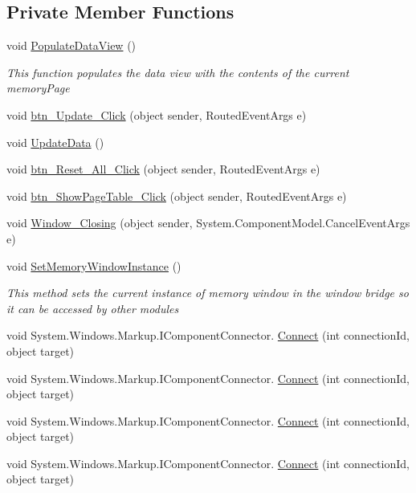 \subsection*{Private Member Functions}
\begin{DoxyCompactItemize}
\item 
void \hyperlink{class_c_p_u___o_s___simulator_1_1_memory_window_a8811287064d6315e3a8c01531148ed81}{Populate\+Data\+View} ()
\begin{DoxyCompactList}\small\item\em This function populates the data view with the contents of the current memory\+Page \end{DoxyCompactList}\item 
void \hyperlink{class_c_p_u___o_s___simulator_1_1_memory_window_a91ec1c8081b85d3c07eaa31ee524f5d9}{btn\+\_\+\+Update\+\_\+\+Click} (object sender, Routed\+Event\+Args e)
\item 
void \hyperlink{class_c_p_u___o_s___simulator_1_1_memory_window_ab0cb156466262b3d90f19acd422dc65b}{Update\+Data} ()
\item 
void \hyperlink{class_c_p_u___o_s___simulator_1_1_memory_window_ac77beff86f4dd6322bdcf2430892d2aa}{btn\+\_\+\+Reset\+\_\+\+All\+\_\+\+Click} (object sender, Routed\+Event\+Args e)
\item 
void \hyperlink{class_c_p_u___o_s___simulator_1_1_memory_window_a0540a495053120e2572a106dbbc391de}{btn\+\_\+\+Show\+Page\+Table\+\_\+\+Click} (object sender, Routed\+Event\+Args e)
\item 
void \hyperlink{class_c_p_u___o_s___simulator_1_1_memory_window_a6123a0a8b93cb6636ed3c039391948a5}{Window\+\_\+\+Closing} (object sender, System.\+Component\+Model.\+Cancel\+Event\+Args e)
\item 
void \hyperlink{class_c_p_u___o_s___simulator_1_1_memory_window_a5100fa341de6de08d11967198cd82208}{Set\+Memory\+Window\+Instance} ()
\begin{DoxyCompactList}\small\item\em This method sets the current instance of memory window in the window bridge so it can be accessed by other modules \end{DoxyCompactList}\item 
void System.\+Windows.\+Markup.\+I\+Component\+Connector. \hyperlink{class_c_p_u___o_s___simulator_1_1_memory_window_aba65e66795c99052ebed93162110e908}{Connect} (int connection\+Id, object target)
\item 
void System.\+Windows.\+Markup.\+I\+Component\+Connector. \hyperlink{class_c_p_u___o_s___simulator_1_1_memory_window_aba65e66795c99052ebed93162110e908}{Connect} (int connection\+Id, object target)
\item 
void System.\+Windows.\+Markup.\+I\+Component\+Connector. \hyperlink{class_c_p_u___o_s___simulator_1_1_memory_window_aba65e66795c99052ebed93162110e908}{Connect} (int connection\+Id, object target)
\item 
void System.\+Windows.\+Markup.\+I\+Component\+Connector. \hyperlink{class_c_p_u___o_s___simulator_1_1_memory_window_aba65e66795c99052ebed93162110e908}{Connect} (int connection\+Id, object target)
\end{DoxyCompactItemize}
